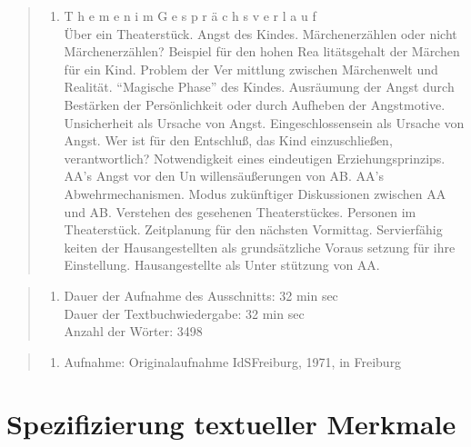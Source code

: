 \documentclass[
  letterpaper,
]{scrbook}
\providecommand{\tightlist}{%
  \setlength{\itemsep}{0pt}\setlength{\parskip}{0pt}}\usepackage{longtable,booktabs,array}
\begin{document}
\begin{quote}
\begin{enumerate}
\def\labelenumi{(\arabic{enumi})}
\setcounter{enumi}{2}
\tightlist
\item
  T h e m e n i m G e s p r ä c h s v e r l a u f\\
  Über ein Theaterstück. Angst des Kindes. Märchenerzählen oder nicht
  Märchenerzählen? Beispiel für den hohen Rea litätsgehalt der Märchen
  für ein Kind. Problem der Ver mittlung zwischen Märchenwelt und
  Realität. ``Magische Phase'' des Kindes. Ausräumung der Angst durch
  Bestärken der Persönlichkeit oder durch Aufheben der Angstmotive.
  Unsicherheit als Ursache von Angst. Eingeschlossensein als Ursache von
  Angst. Wer ist für den Entschluß, das Kind einzuschließen,
  verantwortlich? Notwendigkeit eines eindeutigen Erziehungsprinzips.
  AA's Angst vor den Un willensäußerungen von AB. AA's
  Abwehrmechanismen. Modus zukünftiger Diskussionen zwischen AA und AB.
  Verstehen des gesehenen Theaterstückes. Personen im Theaterstück.
  Zeitplanung für den nächsten Vormittag. Servierfähig keiten der
  Hausangestellten als grundsätzliche Voraus setzung für ihre
  Einstellung. Hausangestellte als Unter stützung von AA.
\end{enumerate}
\end{quote}

\begin{quote}
\begin{enumerate}
\def\labelenumi{(\arabic{enumi})}
\setcounter{enumi}{3}
\tightlist
\item
  Dauer der Aufnahme des Ausschnitts: 32 min sec\\
  Dauer der Textbuchwiedergabe: 32 min sec\\
  Anzahl der Wörter: 3498
\end{enumerate}
\end{quote}

\begin{quote}
\begin{enumerate}
\def\labelenumi{(\arabic{enumi})}
\setcounter{enumi}{4}
\tightlist
\item
  Aufnahme: Originalaufnahme IdSFreiburg, 1971, in Freiburg
\end{enumerate}
\end{quote}

\hypertarget{spezifizierung-textueller-merkmale}{%
\section{Spezifizierung textueller
Merkmale}\label{spezifizierung-textueller-merkmale}}
\end{document}
